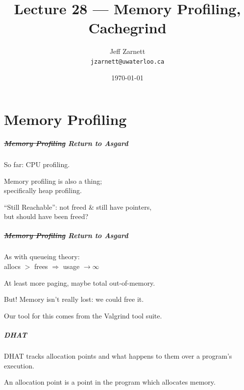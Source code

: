 
\usepackage{soul}

\title{Lecture 28 --- Memory Profiling, Cachegrind }

\author{Jeff Zarnett \\ \small \texttt{jzarnett@uwaterloo.ca}}
\date{\today}




\begin{frame}
  \titlepage

 \end{frame}

\part{Memory Profiling}
\begin{frame}
\partpage
\end{frame}

\begin{frame}
\frametitle{\st{Memory Profiling} Return to Asgard}

\large

So far: CPU profiling. 

Memory profiling is also a thing; \\
\qquad specifically heap profiling.

``Still Reachable'': not freed \& still have pointers, \\
\qquad but should have been freed?


\end{frame}



\begin{frame}
\frametitle{\st{Memory Profiling} Return to Asgard}

\large

As with queueing theory:\\
\qquad allocs $>$ frees $\Longrightarrow$ usage $\rightarrow \infty$

At least more paging, maybe total out-of-memory.

But! Memory isn't really lost: we could free it.

Our tool for this comes from the Valgrind tool suite.


\end{frame}


\begin{frame}
\frametitle{DHAT}
DHAT tracks allocation points and what happens to them over a program's execution. 

An allocation point is a point in the program which allocates memory.

\end{frame}


